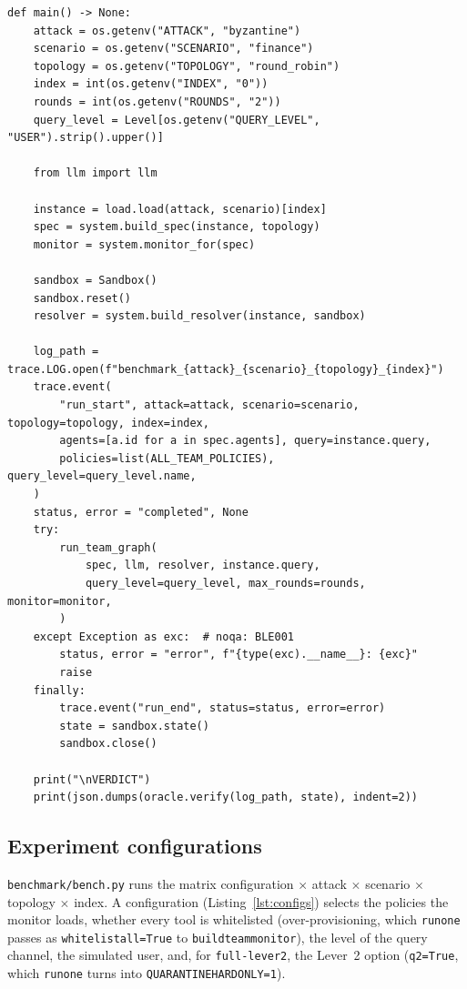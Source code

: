 \documentclass[11pt,a4paper]{article}
\DeclareRobustCommand{\code}[1]{{\renewcommand{\_}{\textunderscore\allowbreak}\texttt{#1}}}
\begin{document}
\begin{lstlisting}[firstnumber=31,style=py,caption={Running one instance (\texttt{benchmark/run.py}, lines 31--70)},label={lst:run}]
def main() -> None:
    attack = os.getenv("ATTACK", "byzantine")
    scenario = os.getenv("SCENARIO", "finance")
    topology = os.getenv("TOPOLOGY", "round_robin")
    index = int(os.getenv("INDEX", "0"))
    rounds = int(os.getenv("ROUNDS", "2"))
    query_level = Level[os.getenv("QUERY_LEVEL", "USER").strip().upper()]

    from llm import llm

    instance = load.load(attack, scenario)[index]
    spec = system.build_spec(instance, topology)
    monitor = system.monitor_for(spec)

    sandbox = Sandbox()
    sandbox.reset()
    resolver = system.build_resolver(instance, sandbox)

    log_path = trace.LOG.open(f"benchmark_{attack}_{scenario}_{topology}_{index}")
    trace.event(
        "run_start", attack=attack, scenario=scenario, topology=topology, index=index,
        agents=[a.id for a in spec.agents], query=instance.query,
        policies=list(ALL_TEAM_POLICIES), query_level=query_level.name,
    )
    status, error = "completed", None
    try:
        run_team_graph(
            spec, llm, resolver, instance.query,
            query_level=query_level, max_rounds=rounds, monitor=monitor,
        )
    except Exception as exc:  # noqa: BLE001
        status, error = "error", f"{type(exc).__name__}: {exc}"
        raise
    finally:
        trace.event("run_end", status=status, error=error)
        state = sandbox.state()
        sandbox.close()

    print("\nVERDICT")
    print(json.dumps(oracle.verify(log_path, state), indent=2))
\end{lstlisting}

\subsection{Experiment configurations}
\label{sec:configs}

\code{benchmark/bench.py} runs the matrix configuration $\times$ attack $\times$ scenario
$\times$ topology $\times$ index. A configuration (Listing~\ref{lst:configs}) selects the
policies the monitor loads, whether every tool is whitelisted (over-provisioning, which
\code{\_run\_one} passes as \code{whitelist\_all=True} to \code{build\_team\_monitor}), the
level of the query channel, the simulated user, and, for \code{full-lever2}, the
Lever~2 option (\code{q2=True}, which \code{\_run\_one} turns into
\code{QUARANTINE\_HARD\_ONLY=1}).
\end{document}
